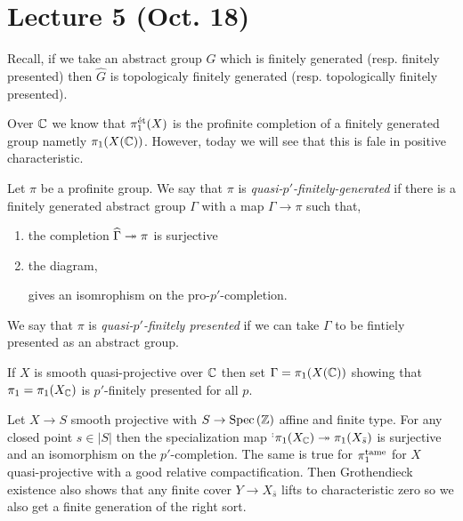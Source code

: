 \documentclass[12pt]{article}
\begin{document}
\section{Lecture 5 (Oct. 18)}

\begin{rmk}
Recall, if we take an abstract group $G$ which is finitely generated (resp. finitely presented) then $\widehat{G}$ is topologicaly finitely generated (resp. topologically finitely presented). 
\end{rmk}

\begin{prop}
Over $\mathbb{C}$ we know that $\pi_1^{\text{\'{e}t}}(X)$ is the profinite completion of a finitely generated group nametly $\pi_1(X(\mathbb{C}))$. However, today we will see that this is fale in positive characteristic. 
\end{prop}

\begin{defn}
Let $\pi$ be a profinite group. We say that $\pi$ is \textit{quasi-$p'$-finitely-generated} if there is a finitely generated abstract group $\Gamma$ with a map $\Gamma \to \pi$ such that,
\begin{enumerate}
\item the completion $\widehat{\Gamma} \twoheadrightarrow \pi$ is surjective
\item the diagram,
\begin{center}
\end{center}
gives an isomrophism on the pro-$p'$-completion.
\end{enumerate}
We say that $\pi$ is \textit{quasi-$p'$-finitely presented} if we can take $\Gamma$ to be fintiely presented as an abstract group.
\end{defn}

\begin{example}
If $X$ is smooth quasi-projective over $\mathbb{C}$ then set $\Gamma = \pi_1(X(\mathbb{C}))$ showing that $\pi_1 = \pi_1(X_{\mathbb{C}})$ is $p'$-finitely presented for all $p$.
\end{example}

\begin{example}
Let $X \to S$ smooth projective with $S \to \mathrm{Spec}\left( \mathbb{Z} \right)$ affine and finite type. For any closed point $s \in |S|$ then the specialization map $\sp : \pi_1(X_{\mathbb{C}}) \twoheadrightarrow \pi_1(X_{\bar{s}})$ is surjective and an isomorphism on the $p'$-completion. The same is true for $\pi_1^{\mathrm{tame}}$ for $X$ quasi-projective with a good relative compactification. Then Grothendieck existence also shows that any finite \etale cover $Y \to X_{\bar{s}}$ lifts to characteristic zero so we also get a finite generation of the right sort. 
\end{example}
\end{document}
